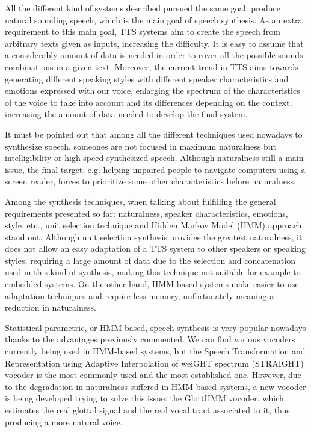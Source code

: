 All the different kind of systems described pursued the same goal: produce natural sounding speech, which is the main goal of speech synthesis. As an extra requirement to this main goal, TTS systems aim to create the speech from arbitrary texts given as inputs, increasing the difficulty. It is easy to assume that a considerably amount of data is needed in order to cover all the possible sounds combinations in a given text. Moreover, the current trend in TTS aims towards generating different speaking styles with different speaker characteristics and emotions expressed with our voice, enlarging the spectrum of the characteristics of the voice to take into account and its differences depending on the context, increasing the amount of data needed to develop the final system. 

It must be pointed out that among all the different techniques used nowadays to synthesize speech, someones are not focused in maximum naturalness but intelligibility or high-speed synthesized speech. Although naturalness still a main issue, the final target, e.g. helping impaired people to navigate computers using a screen reader, forces to prioritize some other characteristics before naturalness. 

Among the synthesis techniques, when talking about fulfilling the general requirements presented so far: naturalness, speaker characteristics, emotions, style, etc., unit selection technique and Hidden Markov Model (HMM) approach stand out. Although unit selection synthesis provides the greatest naturalness, it does not allow an easy adaptation of a TTS system to other speakers or speaking styles, requiring a large amount of data due to the selection and concatenation used in this kind of synthesis, making this technique not suitable for example to embedded systems. On the other hand, HMM-based systems make easier to use adaptation techniques and require less memory, unfortunately meaning a reduction in naturalness.

Statistical parametric, or HMM-based, speech synthesis is very popular nowadays thanks to the advantages previously commented. We can find various vocoders currently being used in HMM-based systems, but the Speech Transformation and Representation using Adaptive Interpolation of weiGHT spectrum (STRAIGHT) vocoder is the most commonly used and the most established one. However, due to the degradation in naturalness suffered in HMM-based systems, a new vocoder is being developed trying to solve this issue: the GlottHMM vocoder, which estimates the real glottal signal and the real vocal tract associated to it, thus producing a more natural voice. 


